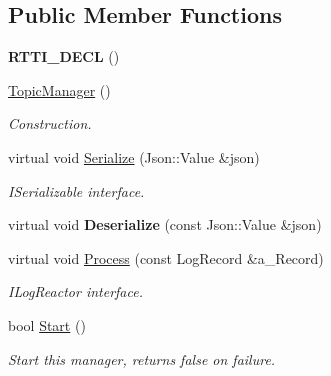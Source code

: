 \subsection*{Public Member Functions}
\begin{DoxyCompactItemize}
\item 
\mbox{\label{class_topic_manager_a6428eb9fabeb46f68a22aca95cc519ab}} 
{\bfseries R\+T\+T\+I\+\_\+\+D\+E\+CL} ()
\item 
\mbox{\label{class_topic_manager_a5561dab14ad2952c21273552bdf10774}} 
\hyperlink{class_topic_manager_a5561dab14ad2952c21273552bdf10774}{Topic\+Manager} ()
\begin{DoxyCompactList}\small\item\em Construction. \end{DoxyCompactList}\item 
\mbox{\label{class_topic_manager_a3c548969f0b269e3ee83f1d950b9ef53}} 
virtual void \hyperlink{class_topic_manager_a3c548969f0b269e3ee83f1d950b9ef53}{Serialize} (Json\+::\+Value \&json)
\begin{DoxyCompactList}\small\item\em I\+Serializable interface. \end{DoxyCompactList}\item 
\mbox{\label{class_topic_manager_a151462dbcd1bd52b166ac4a178213479}} 
virtual void {\bfseries Deserialize} (const Json\+::\+Value \&json)
\item 
\mbox{\label{class_topic_manager_a0886c112b469abc52eefd0c3fc1eb549}} 
virtual void \hyperlink{class_topic_manager_a0886c112b469abc52eefd0c3fc1eb549}{Process} (const Log\+Record \&a\+\_\+\+Record)
\begin{DoxyCompactList}\small\item\em I\+Log\+Reactor interface. \end{DoxyCompactList}\item 
\mbox{\label{class_topic_manager_afa514b1fa1a86c40b4e9164eb04e4429}} 
bool \hyperlink{class_topic_manager_afa514b1fa1a86c40b4e9164eb04e4429}{Start} ()
\begin{DoxyCompactList}\small\item\em Start this manager, returns false on failure. \end{DoxyCompactList}\item 

\end{DoxyCompactItemize}
